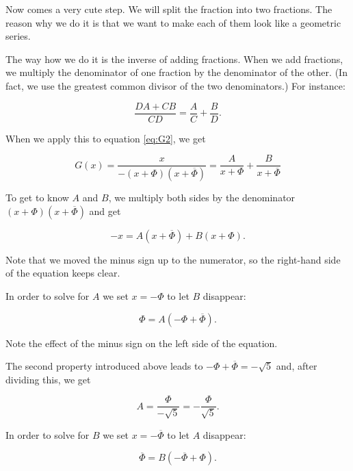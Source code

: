 \documentclass[tikz]{scrreprt}
\begin{document}
Now comes a very cute step.
We will split the fraction into two fractions.
The reason why we do it is that we want to
make each of them look like a geometric series.

The way how we do it is the inverse of
adding fractions. When we add fractions,
we multiply the denominator of one fraction
by the denominator of the other.
(In fact, we use the greatest common divisor
of the two denominators.)
For instance:

\begin{equation}
\frac{DA+CB}{CD} = \frac{A}{C} + \frac{B}{D}.
\end{equation}

When we apply this to equation \ref{eq:G2},
we get

\begin{equation}\label{eq:G3}
G(x) = \frac{x}{-(x+\Phi)(x+\overline{\Phi})} = 
\frac{A}{x+\Phi} + \frac{B}{x+\overline{\Phi}}
\end{equation}

To get to know $A$ and $B$, we multiply both sides
by the denominator $(x+\Phi)(x+\overline{\Phi})$
and get

\begin{equation}
-x = A(x+\overline{\Phi}) + B(x+\Phi).
\end{equation}

Note that we moved the minus sign up to the numerator,
so the right-hand side of the equation keeps clear.

In order to solve for $A$ we set $x=-\Phi$ to let $B$ disappear:

\begin{equation}
\Phi = A(-\Phi+\overline{\Phi}).
\end{equation}

Note the effect of the minus sign on the left side of the equation.

The second property introduced above leads to
$-\Phi+\overline{\Phi} = -\sqrt{5}$ and,
after dividing this, we get

\begin{equation}
A = \frac{\Phi}{-\sqrt{5}} = -\frac{\Phi}{\sqrt{5}}.
\end{equation}

In order to solve for $B$ we set $x=-\overline{\Phi}$ to let $A$ disappear:

\begin{equation}
\overline{\Phi} = B(-\overline{\Phi}+\Phi).
\end{equation}
\end{document}
